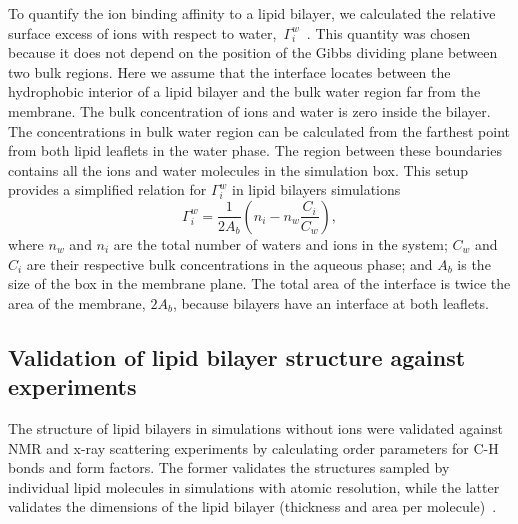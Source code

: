 \documentclass[aip,jcp,twocolumn]{revtex4}
\begin{document}
To quantify the ion binding affinity to a lipid bilayer, we
calculated the relative surface excess of ions with respect to water,~$\Gamma_i^w$~\cite{chattorajBOOK}.
This quantity was chosen because it does not depend on
the position of the Gibbs dividing plane between two bulk regions.
Here we assume that the interface locates between the hydrophobic interior
of a lipid bilayer and the bulk water region far from the membrane.
The bulk concentration of ions and water is zero inside the bilayer.
The concentrations in bulk water region can be calculated from 
the farthest point from both lipid leaflets in the water phase.
The region between these boundaries contains all the ions and water
molecules in the simulation box.
This setup provides a simplified relation for $\Gamma_i^w$ in lipid bilayers simulations 
\begin{equation}\label{surfexcess}
  \Gamma_i^w=\frac{1}{2A_b} \left ( n_i - n_w \frac{C_i}{C_w} \right ) ,
\end{equation}
where $n_w$ and $n_i$ are the total number of waters and ions in the system;
$C_w$ and $C_i$ are their respective bulk concentrations in the aqueous phase;
and $A_b$ is the size of the box in the membrane plane.
The total area of the interface is twice the area of the membrane, $2A_b$,
because bilayers have an interface at both leaflets.



\subsection{Validation of lipid bilayer structure against experiments}

The structure of lipid bilayers in simulations without ions were validated against NMR and 
\mbox{x-ray} scattering experiments by calculating order parameters
for C-H bonds and form factors. The former validates the structures sampled by individual
lipid molecules in simulations with atomic resolution, while the latter
validates the dimensions of the lipid bilayer (thickness and area per
molecule)~\cite{ollila16}.
\end{document}
